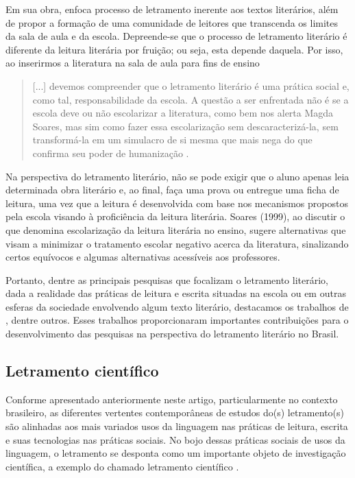 \documentclass{textolivre}
\begin{document}
Em sua obra, \textcite{cosson_letramento_2009} enfoca processo de letramento inerente aos textos literários, além de propor a formação de uma comunidade de leitores que transcenda os limites da sala de aula e da escola. Depreende-se que o processo de letramento literário é diferente da leitura literária por fruição; ou seja, esta depende daquela. Por isso, ao inserirmos a literatura na sala de aula para fins de ensino

\begin{quote}
    [...] devemos compreender que o letramento literário é uma prática social e, como tal, responsabilidade da escola. A questão a ser enfrentada não é se a escola deve ou não escolarizar a literatura, como bem nos alerta Magda Soares, mas sim como fazer essa escolarização sem descaracterizá-la, sem transformá-la em um simulacro de si mesma que mais nega do que confirma seu poder de humanização \cite[p. 23]{cosson_letramento_2009}. 
\end{quote}

Na perspectiva do letramento literário, não se pode exigir que o aluno apenas leia determinada obra literário e, ao final, faça uma prova ou entregue uma ficha de leitura, uma vez que a leitura é desenvolvida com base nos mecanismos propostos pela escola visando à proficiência da leitura literária. Soares (1999), ao discutir o que denomina escolarização da leitura literária no ensino, sugere alternativas que visam a minimizar o tratamento escolar negativo acerca da literatura, sinalizando certos equívocos e algumas alternativas acessíveis aos professores.

Portanto, dentre as principais pesquisas que focalizam o letramento literário, dada a realidade das práticas de leitura e escrita situadas na escola ou em outras esferas da sociedade envolvendo algum texto literário, destacamos os trabalhos de \textcite{lajolo_leitura_1991, soares_escolarizacao_1999, paulino_letramento_2001, cosson_letramento_2009}, dentre outros. Esses trabalhos proporcionaram importantes contribuições para o desenvolvimento das pesquisas na perspectiva do letramento literário no Brasil.

\subsection{Letramento científico}\label{sec-cientifica}
Conforme apresentado anteriormente neste artigo, particularmente no contexto brasileiro, as diferentes vertentes contemporâneas de estudos do(s) letramento(s) são alinhadas aos mais variados usos da linguagem nas práticas de leitura, escrita e suas tecnologias nas práticas sociais. No bojo dessas práticas sociais de usos da linguagem, o letramento se desponta como um importante objeto de investigação científica, a exemplo do chamado letramento científico \cite{santos_educacao_2007, cunha_alfabetizacao_2017}. 
\end{document}
